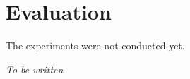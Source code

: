 \section{Evaluation}
The experiments were not conducted yet.  
\label{evaluation}

\textit{To be written}

